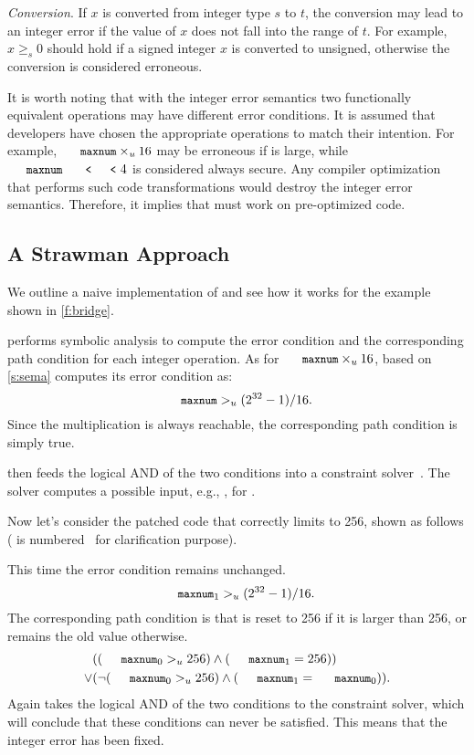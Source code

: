 \noindent
{\it Conversion}.
If $x$ is converted from integer type $s$ to $t$, the conversion
may lead to an integer error if the value of $x$ does not fall into
the range of $t$.  For example, $x \geq_s 0$ should hold if a signed
integer $x$ is converted to unsigned, otherwise the conversion is
considered erroneous.

It is worth noting that with the integer error semantics two functionally
equivalent operations may have different error conditions.  It is
assumed that developers have chosen the appropriate operations to
match their intention.  For example, $\cc{maxnum}\times_u 16$ may
be erroneous if  is large, while $\cc{maxnum} \shl 4$ is
considered always secure.  Any compiler optimization that performs
such code transformations would destroy the integer error semantics.
Therefore, it implies that \sys must work on pre-optimized code.

\subsection{A Strawman Approach}

We outline a naive implementation of \sys and see how it works
for the example shown in \autoref{f:bridge}.

\sys performs symbolic analysis to compute the error condition and
the corresponding path condition for each integer operation.  As
for $\cc{maxnum} \times_u 16$, based on \autoref{s:sema}
\sys computes its error condition as:
\begin{equation*}
\cc{maxnum} >_u (2^{32} - 1) / 16.
\end{equation*}
Since the multiplication is always reachable, the corresponding
path condition is simply true.

\sys then feeds the logical AND of the two conditions into a
constraint solver~\cite{boolector}.  The solver computes a possible
input, e.g., , for .

Now let's consider the patched code that correctly limits 
to 256, shown as follows ( is
numbered~\cite[\chapterautorefname~8.11]{whale} for clarification
purpose).

This time the error condition remains unchanged.
\begin{equation*}
\cc{maxnum}_1 >_u (2^{32} - 1) / 16.
\end{equation*}
The corresponding path condition is that  is reset to 256
if it is larger than 256, or remains the old value otherwise.
\begin{align*}
& ((\cc{maxnum}_0 >_u 256) \land (\cc{maxnum}_1 = 256)) \\
\lor
& (\neg (\cc{maxnum}_0 >_u 256) \land (\cc{maxnum}_1 = \cc{maxnum}_0)).
\end{align*}
Again \sys takes the logical AND of the two conditions to the
constraint solver, which will conclude that these conditions can
never be satisfied.  This means that the integer error has been
fixed.

